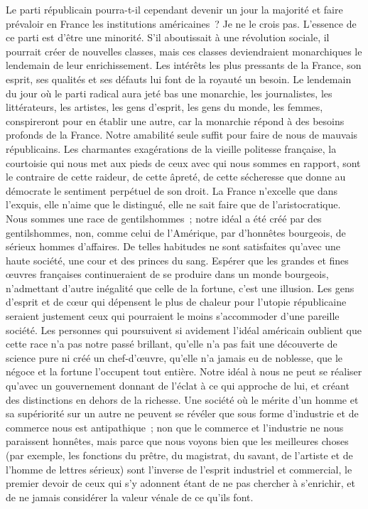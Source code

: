\documentclass[french,twoside]{book} %
\begin{document}
Le parti républicain pourra-t-il cependant devenir un jour la majorité et faire prévaloir en France les institutions américaines ? Je ne le crois pas. L’essence de ce parti est d’être une minorité. S’il aboutissait à une révolution sociale, il pourrait créer de nouvelles classes, mais ces classes deviendraient monarchiques le lendemain de leur enrichissement. Les intérêts les plus pressants de la France, son esprit, ses qualités et ses défauts lui font de la royauté un besoin. Le lendemain du jour où le parti radical aura jeté bas une monarchie, les journalistes, les littérateurs, les artistes, les gens d’esprit, les gens du monde, les femmes, conspireront pour en établir une autre, car la monarchie répond à des besoins profonds de la France. Notre amabilité seule suffit pour faire de nous de mauvais républicains. Les charmantes exagérations de la vieille politesse française, la courtoisie qui nous met aux pieds de ceux avec qui nous sommes en rapport, sont le contraire de cette raideur, de cette âpreté, de cette sécheresse que donne au démocrate le sentiment perpétuel de son droit. La France n’excelle que dans l’exquis, elle n’aime que le distingué, elle ne sait faire que de l’aristocratique. Nous sommes une race de gentilshommes ; notre idéal a été créé par des gentilshommes, non, comme celui de l’Amérique, par d’honnêtes bourgeois, de sérieux hommes d’affaires. De telles habitudes ne sont satisfaites qu’avec une haute société, une cour et des princes du sang. Espérer que les grandes et fines œuvres françaises continueraient de se produire dans un monde bourgeois, n’admettant d’autre inégalité que celle de la fortune, c’est une illusion. Les gens d’esprit et de cœur qui dépensent le plus de chaleur pour l’utopie républicaine seraient justement ceux qui pourraient le moins s’accommoder d’une pareille société. Les personnes qui poursuivent si avidement l’idéal américain oublient que cette race n’a pas notre passé brillant, qu’elle n’a pas fait une découverte de science pure ni créé un chef-d’œuvre, qu’elle n’a jamais eu de noblesse, que le négoce et la fortune l’occupent tout entière. Notre idéal à nous ne peut se réaliser qu’avec un gouvernement donnant de l’éclat à ce qui approche de lui, et créant des distinctions en dehors de la richesse. Une société où le mérite d’un homme et sa supériorité sur un autre ne peuvent se révéler que sous forme d’industrie et de commerce nous est antipathique ; non que le commerce et l’industrie ne nous paraissent honnêtes, mais parce que nous voyons bien que les meilleures choses (par exemple, les fonctions du prêtre, du magistrat, du savant, de l’artiste et de l’homme de lettres sérieux) sont l’inverse de l’esprit industriel et commercial, le premier devoir de ceux qui s’y adonnent étant de ne pas chercher à s’enrichir, et de ne jamais considérer la valeur vénale de ce qu’ils font.\par
\end{document}
